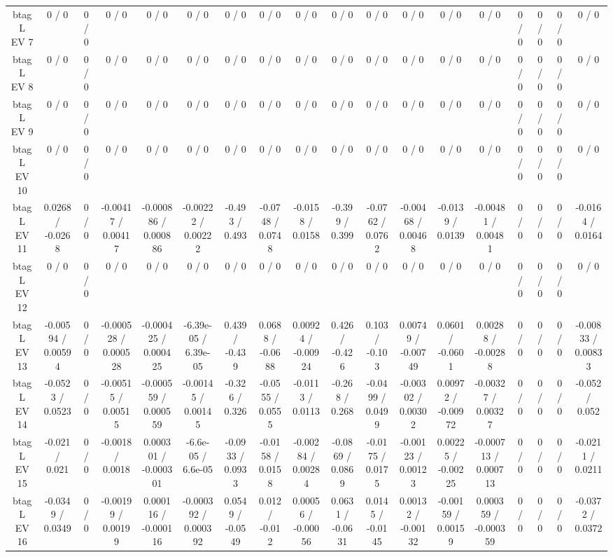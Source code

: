 \documentclass[10pt]{article}
\begin{document}
\begin{table}[htbp]
\begin{center}
\begin{tabular}{|c|c|c|c|c|c|c|c|c|c|c|c|c|c|c|c|c|c|}
  btag L EV 7 & 0 / 0 & 0 / 0 & 0 / 0 & 0 / 0 & 0 / 0 & 0 / 0 & 0 / 0 & 0 / 0 & 0 / 0 & 0 / 0 & 0 / 0 & 0 / 0 & 0 / 0 & 0 / 0 & 0 / 0 & 0 / 0 & 0 / 0 \\ 
  btag L EV 8 & 0 / 0 & 0 / 0 & 0 / 0 & 0 / 0 & 0 / 0 & 0 / 0 & 0 / 0 & 0 / 0 & 0 / 0 & 0 / 0 & 0 / 0 & 0 / 0 & 0 / 0 & 0 / 0 & 0 / 0 & 0 / 0 & 0 / 0 \\ 
  btag L EV 9 & 0 / 0 & 0 / 0 & 0 / 0 & 0 / 0 & 0 / 0 & 0 / 0 & 0 / 0 & 0 / 0 & 0 / 0 & 0 / 0 & 0 / 0 & 0 / 0 & 0 / 0 & 0 / 0 & 0 / 0 & 0 / 0 & 0 / 0 \\ 
  btag L EV 10 & 0 / 0 & 0 / 0 & 0 / 0 & 0 / 0 & 0 / 0 & 0 / 0 & 0 / 0 & 0 / 0 & 0 / 0 & 0 / 0 & 0 / 0 & 0 / 0 & 0 / 0 & 0 / 0 & 0 / 0 & 0 / 0 & 0 / 0 \\ 
  btag L EV 11 & 0.0268 / -0.0268 & 0 / 0 & -0.00417 / 0.00417 & -0.000886 / 0.000886 & -0.00222 / 0.00222 & -0.493 / 0.493 & -0.0748 / 0.0748 & -0.0158 / 0.0158 & -0.399 / 0.399 & -0.0762 / 0.0762 & -0.00468 / 0.00468 & -0.0139 / 0.0139 & -0.00481 / 0.00481 & 0 / 0 & 0 / 0 & 0 / 0 & -0.0164 / 0.0164 \\ 
  btag L EV 12 & 0 / 0 & 0 / 0 & 0 / 0 & 0 / 0 & 0 / 0 & 0 / 0 & 0 / 0 & 0 / 0 & 0 / 0 & 0 / 0 & 0 / 0 & 0 / 0 & 0 / 0 & 0 / 0 & 0 / 0 & 0 / 0 & 0 / 0 \\ 
  btag L EV 13 & -0.00594 / 0.00594 & 0 / 0 & -0.000528 / 0.000528 & -0.000425 / 0.000425 & -6.39e-05 / 6.39e-05 & 0.439 / -0.439 & 0.0688 / -0.0688 & 0.00924 / -0.00924 & 0.426 / -0.426 & 0.103 / -0.103 & 0.00749 / -0.00749 & 0.0601 / -0.0601 & 0.00288 / -0.00288 & 0 / 0 & 0 / 0 & 0 / 0 & -0.00833 / 0.00833 \\ 
  btag L EV 14 & -0.0523 / 0.0523 & 0 / 0 & -0.00515 / 0.00515 & -0.000559 / 0.000559 & -0.00145 / 0.00145 & -0.326 / 0.326 & -0.0555 / 0.0555 & -0.0113 / 0.0113 & -0.268 / 0.268 & -0.0499 / 0.0499 & -0.00302 / 0.00302 & 0.00972 / -0.00972 & -0.00327 / 0.00327 & 0 / 0 & 0 / 0 & 0 / 0 & -0.052 / 0.052 \\ 
  btag L EV 15 & -0.021 / 0.021 & 0 / 0 & -0.0018 / 0.0018 & 0.000301 / -0.000301 & -6.6e-05 / 6.6e-05 & -0.0933 / 0.0933 & -0.0158 / 0.0158 & -0.00284 / 0.00284 & -0.0869 / 0.0869 & -0.0175 / 0.0175 & -0.00123 / 0.00123 & 0.00225 / -0.00225 & -0.000713 / 0.000713 & 0 / 0 & 0 / 0 & 0 / 0 & -0.0211 / 0.0211 \\ 
  btag L EV 16 & -0.0349 / 0.0349 & 0 / 0 & -0.00199 / 0.00199 & 0.000116 / -0.000116 & -0.000392 / 0.000392 & 0.0549 / -0.0549 & 0.012 / -0.012 & 0.00056 / -0.00056 & 0.0631 / -0.0631 & 0.0145 / -0.0145 & 0.00132 / -0.00132 & -0.00159 / 0.00159 & 0.000359 / -0.000359 & 0 / 0 & 0 / 0 & 0 / 0 & -0.0372 / 0.0372 \\ 

\end{tabular}
\end{center}
\end{table}
\end{document}
